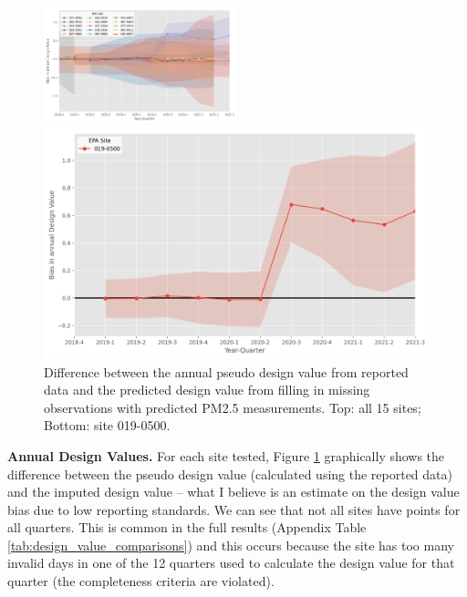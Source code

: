 \documentclass[12pt]{article}
\begin{document}
\FloatBarrier

\begin{figure}
    \centering
    \includegraphics[width=0.5\textwidth]{output/figures/final_results/DV_annual_plot_all_test_sites.png}
    \smallskip\par
    \includegraphics[width=\linewidth]{output/figures/final_results/DV_annual_plot_site_019-0500.png}
    \caption{Difference between the annual pseudo design value from reported data and the predicted design value from filling in missing observations with predicted PM2.5 measurements. Top: all 15 sites; Bottom: site 019-0500.}
    \label{fig:dv_annual}
\end{figure}

\noindent\textbf{Annual Design Values.} For each site tested, Figure \ref{fig:dv_annual} graphically shows the difference between the pseudo design value (calculated using the reported data) and the imputed design value -- what I believe is an estimate on the design value bias due to low reporting standards. We can see that not all sites have points for all quarters. This is common in the full results (Appendix Table \ref{tab:design_value_comparisons}) and this occurs because the site has too many invalid days in one of the 12 quarters used to calculate the design value for that quarter (the completeness criteria are violated). 
\end{document}
